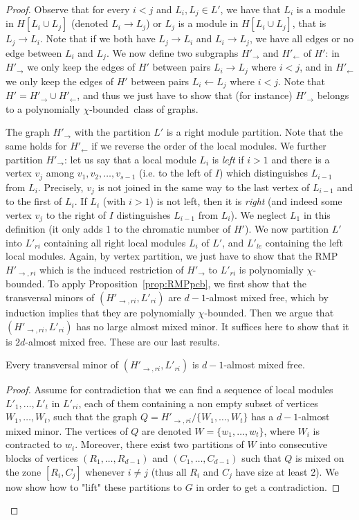 \documentclass[11pt]{article}
\numberwithin{equation}{section}
\newcommand{\pcb}{polynomially $\chi$-bounded}
\begin{document}
\begin{proof}
Observe that for every $i<j$ and $L_i,L_j\in L'$, we have that $L_i$ is a module in $H[L_i\cup L_j]$ (denoted $L_i\rightarrow L_j$) or $L_j$ is a module in $H[L_i\cup L_j]$, that is $L_j\rightarrow L_i$. Note that if we both have $L_j\rightarrow L_i$ and $L_i\rightarrow L_j$, we have all edges or no edge between $L_i$ and $L_j$. We now define two subgraphs $H'_{\rightarrow}$ and $H'_{\leftarrow}$ of $H'$: in $H'_{\rightarrow}$ we only keep the edges of $H'$ between pairs $L_i\rightarrow L_j$ where $i<j$, and in $H'_{\leftarrow}$ we only keep the edges of $H'$ between pairs $L_i\leftarrow L_j$ where $i<j$.
Note that $H'=H'_{\rightarrow}\cup H'_{\leftarrow}$, and thus we just have to show that (for instance) $H'_{\rightarrow}$ belongs to a \pcb~class of graphs.

The graph $H'_{\rightarrow}$ with the partition $L'$ is a right module partition. Note that the same holds for $H'_{\leftarrow}$ if we reverse the order of the local modules. 
We further partition $H'_{\rightarrow}$: let us say that a local module $L_i$ is \emph{left} if $i>1$ and there is a vertex $v_j$ among $v_1,v_2,\dots,v_{s-1}$ (i.e. to the left of $I$) which distinguishes $L_{i-1}$ from $L_i$. Precisely, $v_j$ is not joined in the same way to the last vertex of $L_{i-1}$ and to the first of $L_i$. If $L_i$ (with $i>1$) is not left, then it is \emph{right} (and indeed some vertex $v_j$ to the right of $I$ distinguishes $L_{i-1}$ from $L_i$). We neglect $L_1$ in this definition (it only adds 1 to the chromatic number of $H'$). We now partition $L'$ into $L'_{ri}$ containing all right local modules $L_i$ of $L'$, and $L'_{le}$ containing the left local modules. Again, by vertex partition, we just have to show that the RMP $H'_{\rightarrow,ri}$ which is the induced restriction of $H'_{\rightarrow}$ to $L'_{ri}$ is \pcb. To apply Proposition~\ref{prop:RMPpcb}, we first show that the transversal minors of  $(H'_{\rightarrow,ri},L'_{ri})$ are $d-1$-almost mixed free, which by induction implies that they are \pcb. Then we argue that $(H'_{\rightarrow, ri},L'_{ri})$ has no large almost mixed minor. It suffices here to show that it is $2d$-almost mixed free. These are our last results.

\begin{claim}[\cite{PS22}]\label{claim:twwreduction}
    Every transversal minor of  $(H'_{\rightarrow,ri},L'_{ri})$ is $d-1$-almost mixed free.
\end{claim}

\begin{proof}
Assume for contradiction that we can find a sequence of local modules $L'_1,\dots ,L'_t$ in $L'_{ri}$, each of them containing a non empty subset of vertices $W_1,\dots ,W_t$, such that the graph $Q=H'_{\rightarrow,ri}/\{W_1,\dots ,W_t\}$ has a $d-1$-almost mixed minor. The vertices of $Q$ are denoted $W=\{w_1,\dots ,w_t\}$, where $W_i$ is contracted to $w_i$. Moreover, there exist two partitions of $W$ into consecutive blocks of vertices $(R_1,\dots ,R_{d-1})$ and $(C_1,\dots ,C_{d-1})$ such that $Q$ is mixed on the zone $[R_i,C_j]$ whenever $i\neq j$ (thus all $R_i$ and $C_j$ have size at least 2). We now show how to "lift" these partitions to $G$ in order to get a contradiction.


\end{proof}
\end{proof}
\end{document}
